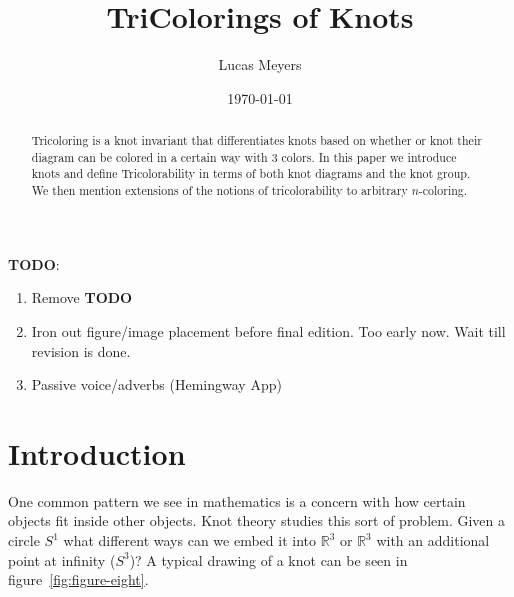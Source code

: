 \documentclass[12pt]{amsart}
\theoremstyle{definition}
\theoremstyle{remark}
\numberwithin{equation}{section}
\newcommand{\bb}[1]{\mathbb{#1}}
\begin{document}
\title{TriColorings of Knots}


\author{Lucas Meyers}
\address{Mathematics Department\\
Louisiana State University\\
Baton Rouge, Louisiana}

\date{\today}

\begin{abstract}
  Tricoloring is a knot invariant that differentiates knots
  based on whether or knot their diagram can be colored in a
  certain way with 3 colors. In this paper we introduce knots
  and define Tricolorability in terms of both knot diagrams
  and the knot group. We then mention extensions of the notions
  of tricolorability to arbitrary $n$-coloring.
\end{abstract}

\maketitle
\textbf{TODO}:
\begin{enumerate}
\item Remove \textbf{TODO}
\item Iron out figure/image placement before final edition. Too early
  now. Wait till revision is done.
\item Passive voice/adverbs (Hemingway App)
\end{enumerate}

\section{Introduction}
\label{introduction}

One common pattern we see in mathematics is a concern with how
certain objects fit inside other objects. Knot theory studies this
sort of problem. Given a circle $S^1$ what different ways can we embed
it into $\bb{R}^3$ or $\bb{R}^3$  with an additional point at infinity ($S^3$)?
A typical drawing of a knot can be seen in figure~\ref{fig:figure-eight}.
\end{document}
